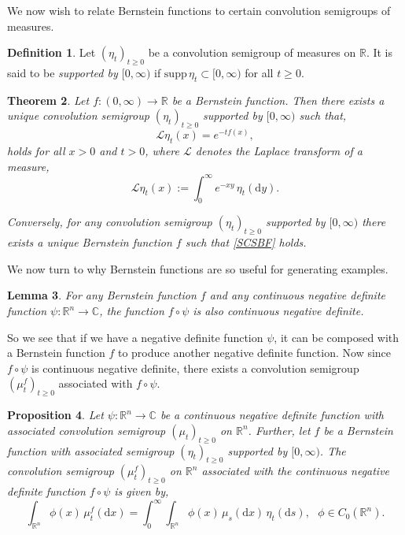 \documentclass[a4paper, 12pt]{report}
\newtheorem{theorem}{Theorem}[section]
\newtheorem{lemma}[theorem]{Lemma}
\newtheorem{proposition}[theorem]{Proposition}
\theoremstyle{remark}
\theoremstyle{definition}
\newtheorem{definition}[theorem]{Definition}
\begin{document}
We now wish to relate Bernstein functions to certain convolution semigroups of measures.
\begin{definition}
Let $(\eta_t)_{t \ge 0}$ be a convolution semigroup of measures on $\mathbb{R}$.  It is said to be \emph{supported by $[0, \infty)$} if $\mathrm{supp}\,\eta_t \subset[0, \infty)$ for all $t \ge 0$.
\end{definition}

\begin{theorem}
Let $f : (0, \infty) \to \mathbb{R}$ be a Bernstein function.  Then there exists a unique convolution semigroup $(\eta_t)_{t \ge 0}$ supported by $[0, \infty)$ such that,
\begin{equation}
\mathcal{L}\eta_t(x) = e^{-tf(x)},\label{SCSBF}
\end{equation}
holds for all $x > 0$ and $t > 0$, where $\mathcal{L}$ denotes the Laplace transform of a measure,
$$
\mathcal{L}\eta_t(x) := \int_0^\infty e^{-xy}\,\eta_t(\mathrm{d}y).
$$

Conversely, for any convolution semigroup $(\eta_t)_{t \ge 0}$ supported by $[0, \infty)$ there exists a unique Bernstein function $f$ such that \eqref{SCSBF} holds.
\end{theorem}

We now turn to why Bernstein functions are so useful for generating examples.
\begin{lemma}
For any Bernstein function $f$ and any continuous negative definite function $\psi : \mathbb{R}^n \to \mathbb{C}$, the function $f \circ \psi$ is also continuous negative definite.
\end{lemma}

So we see that if we have a negative definite function $\psi$, it can be composed with a Bernstein function $f$ to produce another negative definite function.  Now since $f \circ \psi$ is continuous negative definite, there exists a convolution semigroup $(\mu_t^f)_{t \ge 0}$ associated with $f \circ \psi$.
\begin{proposition}\label{FTaSBFP2}
Let $\psi : \mathbb{R}^n \to \mathbb{C}$ be a continuous negative definite function with associated convolution semigroup $(\mu_t)_{t \ge 0}$ on $\mathbb{R}^n$.  Further, let $f$ be a Bernstein function with associated semigroup $(\eta_t)_{t \ge 0}$ supported by $[0, \infty)$.  The convolution semigroup $(\mu_t^f)_{t \ge 0}$ on $\mathbb{R}^n$ associated with the continuous negative definite function $f \circ \psi$ is given by,
\begin{equation}
\int_{\mathbb{R}^n}\phi(x)\,\mu_t^f(\mathrm{d}x) = \int_0^\infty\int_{\mathbb{R}^n}\phi(x)\,\mu_s(\mathrm{d}x)\,\eta_t(\mathrm{d}s), \,\,\,\, \phi \in C_0(\mathbb{R}^n).
\end{equation}
\end{proposition}
\end{document}
